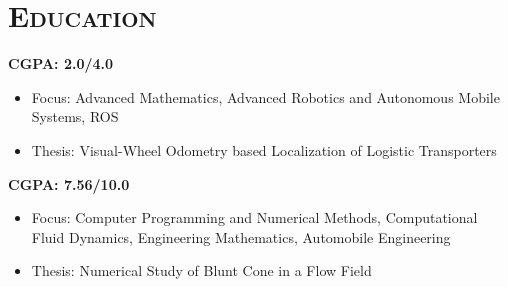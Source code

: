 \documentclass[11pt,a4paper,roman]{moderncv} %
\begin{document}
\makecvtitle %


\section{\scshape{\huge Education}}

\vspace{10pt}

{
\textbf{CGPA: 2.0/4.0}
\vspace{5pt}
\begin{itemize}
\item Focus: Advanced Mathematics, Advanced Robotics and Autonomous Mobile Systems, ROS
\item Thesis: Visual-Wheel Odometry based Localization of Logistic Transporters
\end{itemize}
}

\vspace{10pt}

{
\textbf{CGPA: 7.56/10.0}
\vspace{5pt}
\begin{itemize}
\item Focus: Computer Programming and Numerical Methods, Computational Fluid Dynamics, Engineering Mathematics, Automobile Engineering
\item Thesis: Numerical Study of Blunt Cone in a Flow Field
\end{itemize}
}
\end{document}
